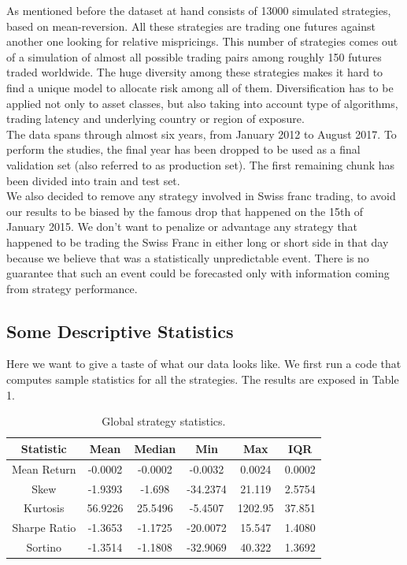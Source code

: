 \documentclass[12pt]{article} %
\numberwithin{equation}{subsection}
\begin{document}
As mentioned before the dataset at hand consists of 13000 simulated strategies, based on mean-reversion. All these strategies are trading one futures against another one looking for relative mispricings. This number of strategies comes out of a simulation of almost all possible trading pairs among roughly 150 futures traded worldwide. The huge diversity among these strategies makes it hard to find a unique model to allocate risk among all of them. Diversification has to be applied not only to asset classes, but also taking into account type of algorithms, trading latency and underlying country or region of exposure.\\
The data spans through almost six years, from January 2012 to August 2017. To perform the studies, the final year has been dropped to be used as a final validation set (also referred to as production set). The first remaining chunk has been divided into train and test set.\\
We also decided to remove any strategy involved in Swiss franc trading, to avoid our results to be biased by the famous drop that happened on the 15th of January 2015. We don't want to penalize or advantage any strategy that happened to be trading the Swiss Franc in either long or short side in that day because we believe that was a statistically unpredictable event. There is no guarantee that such an event could be forecasted only with information coming from strategy performance.\\

\subsection{Some Descriptive Statistics}

Here we want to give a taste of what our data looks like. We first run a code that computes sample statistics for all the strategies. The results are exposed in Table 1. 

\begin{table}
	\centering
	\begin{tabular}{c|c|c|c|c|c}
		Statistic   & Mean & Median & Min & Max & IQR \\\hline
		Mean Return & -0.0002 & -0.0002 & -0.0032 & 0.0024 & 0.0002 \\ 
		Skew        & -1.9393 & -1.698 & -34.2374 & 21.119 & 2.5754 \\ 
		Kurtosis    & 56.9226 & 25.5496 & -5.4507 & 1202.95 & 37.851 \\ 
		Sharpe Ratio& -1.3653 & -1.1725 & -20.0072 & 15.547 & 1.4080 \\ 
		Sortino     &-1.3514 & -1.1808 & -32.9069 & 40.322 & 1.3692 \\ 
	\end{tabular}
	\caption{\label{tab:widgets} Global strategy statistics.}
\end{table}
\end{document}
